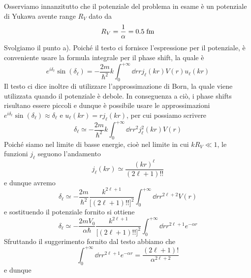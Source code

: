 \begin{soluzione}
   Osserviamo innanzitutto che il potenziale del problema in esame è un potenziale di Yukawa avente range $R_V$ dato da
   \begin{equation*}
      R_V
      =\frac{1}{\alpha}
      =0.5 \rm \; fm
   \end{equation*}
   Svolgiamo il punto a). Poiché il testo ci fornisce l'espressione per il potenziale, è conveniente usare la formula integrale per il phase shift, la quale è
   \begin{equation*}
      e^{i \delta_{\ell}} \sin{(\delta_{\ell})}
      =-\frac{2 m}{\hbar^2} k \int_{0}^{+\infty} \dd{r} r j_{\ell}(k r) V(r) u_{\ell}(kr)
   \end{equation*}
      Il testo ci dice inoltre di utilizzare l'approssimazione di Born, la quale viene utilizzata quando il potenziale è debole. In conseguenza a ciò, i phase shifts risultano essere piccoli e dunque è possibile usare le approssimazioni $e^{i \delta_{\ell}} \sin{(\delta_{\ell})} \approx \delta_{\ell}$ e $u_{\ell}(kr)=r j_{\ell}(k r)$, per cui possiamo scrivere
   \begin{equation*}
      \delta_{\ell}
      \simeq -\frac{2 m}{\hbar^2} k \int_{0}^{+\infty} \dd{r} r^2 j^2_{\ell}(k r) V(r)
   \end{equation*}
   Poiché siamo nel limite di basse energie, cioè nel limite in cui $k R_V \ll 1$, le funzioni $j_{\ell}$ seguono l'andamento
   \begin{equation*}
      j_{\ell}(kr)
      \simeq \frac{(kr)^{\ell}}{(2 \ell + 1)!!}
   \end{equation*}
   e dunque avremo
   \begin{equation*}
      \delta_{\ell}
      \simeq -\frac{2 m}{\hbar^2} \frac{k^{2 \ell + 1}}{\bigl[ (2 \ell + 1)!! \bigr]^2} \int_{0}^{+\infty} \dd{r} r^{2 \ell + 2} V(r)
   \end{equation*}
   e sostituendo il potenziale fornito si ottiene
   \begin{equation*}
      \delta_{\ell}
      \simeq -\frac{2 m V_0}{\alpha \hbar} \frac{k^{2 \ell + 1}}{\bigl[ (2 \ell + 1)!! \bigr]^2} \int_{0}^{+\infty} \dd{r} r^{2 \ell + 1} e^{-\alpha r}
   \end{equation*}
   Sfruttando il suggerimento fornito dal testo abbiamo che
   \begin{equation*}
      \int_{0}^{+\infty} \dd{r} r^{2 \ell + 1} e^{-\alpha r}
      =\frac{(2 \ell + 1)!}{\alpha^{2 \ell + 2}}
   \end{equation*}
   e dunque

\end{soluzione}
